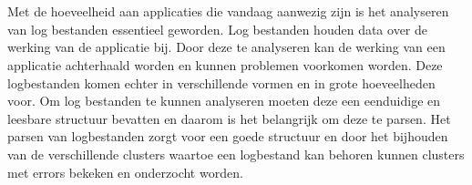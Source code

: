 
%
%

%



\chapter*{}

Met de hoeveelheid aan applicaties die vandaag aanwezig zijn is het analyseren van log bestanden essentieel geworden. Log bestanden houden data over de werking van de applicatie bij. Door deze te analyseren kan de werking van een applicatie achterhaald worden en kunnen problemen voorkomen worden. Deze logbestanden komen echter in verschillende vormen en in grote hoeveelheden voor. Om log bestanden te kunnen analyseren moeten deze een eenduidige en leesbare structuur bevatten en daarom is het belangrijk om deze te parsen. Het parsen van logbestanden zorgt voor een goede structuur en door het bijhouden van de verschillende clusters waartoe een logbestand kan behoren kunnen clusters met errors bekeken en onderzocht worden.\\

